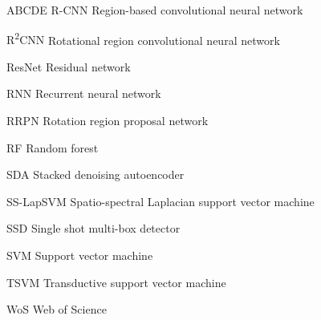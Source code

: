 \begin{seznamzkratek}{ABCDE}
	      {R-CNN}
	      {Region-based convolutional neural network}

	      {R\textsuperscript{2}CNN}
	      {Rotational region convolutional neural network}

	      {ResNet}
	      {Residual network}

	      {RNN}
	      {Recurrent neural network}

	      {RRPN}
	      {Rotation region proposal network}

	      {RF}
	      {Random forest}

	      {SDA}
	      {Stacked denoising autoencoder}

	      {SS-LapSVM}
	      {Spatio-spectral Laplacian support vector machine}

	      {SSD}
	      {Single shot multi-box detector}

	      {SVM}
	      {Support vector machine}

	      {TSVM}
	      {Transductive support vector machine}

	      {WoS}
	      {Web of Science}
	      
\end{seznamzkratek}
